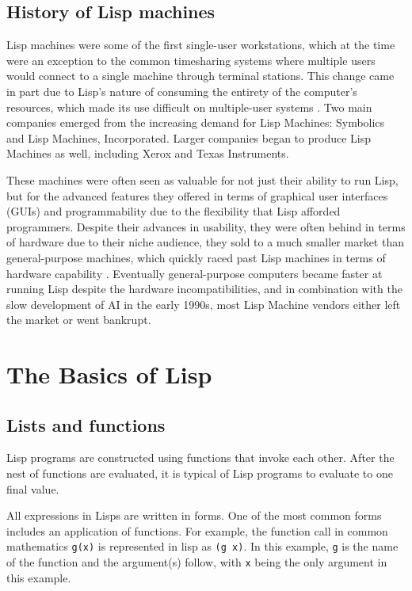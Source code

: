 \documentclass[journal]{IEEEtran}
\begin{document}
\subsection{History of Lisp machines}
Lisp machines were some of the first single-user workstations, which at the time were an exception to the common timesharing systems where multiple users would connect to a single machine through terminal stations. This change came in part due to Lisp's nature of consuming the entirety of the computer's resources, which made its use difficult on multiple-user systems \cite{andromeda}. Two main companies emerged from the increasing demand for Lisp Machines: Symbolics and Lisp Machines, Incorporated. Larger companies began to produce Lisp Machines as well, including Xerox and Texas Instruments. 

These machines were often seen as valuable for not just their ability to run Lisp, but for the advanced features they offered in terms of graphical user interfaces (GUIs) and programmability due to the flexibility that Lisp afforded programmers. Despite their advances in usability, they were often behind in terms of hardware due to their niche audience, they sold to a much smaller market than general-purpose machines, which quickly raced past Lisp machines in terms of hardware capability \cite{withington}. Eventually general-purpose computers became faster at running Lisp despite the hardware incompatibilities, and in combination with the slow development of AI in the early 1990s, most Lisp Machine vendors either left the market or went bankrupt.

\section{The Basics of Lisp}

\subsection{Lists and functions}
Lisp programs are constructed using functions that invoke each other. After the nest of functions are evaluated, it is typical of Lisp programs to evaluate to one final value.

All expressions in Lisps are written in forms. One of the most common forms includes an application of functions. For example, the function call in common mathematics \texttt{g(x)} is represented in lisp as \texttt{(g x)}. In this example, \texttt{g} is the name of the function and the argument(s) follow, with \texttt{x} being the only argument in this example.
\end{document}
